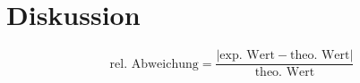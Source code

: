 \section{Diskussion}
\label{sec:Diskussion}
$$\text{rel. Abweichung} = \frac{|\text{exp. Wert} - \text{theo. Wert}|}{\text{theo. Wert}}$$
